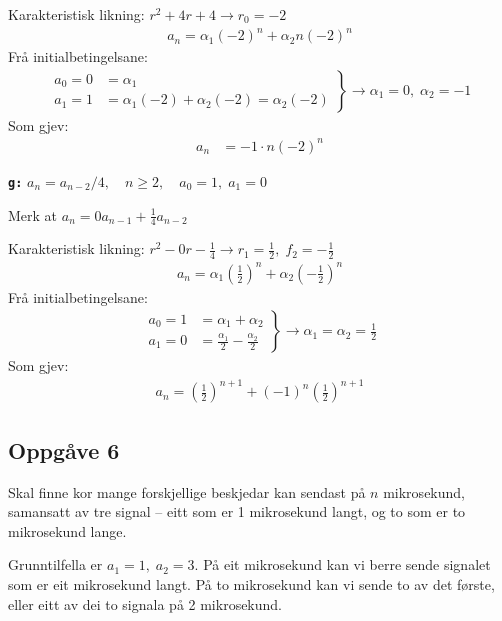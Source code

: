 \documentclass[a4paper, 11pt]{article}
\newcommand{\deloppg}[1]{\vspace{1mm}\noindent \textbf{\tt \themecolor{#1:}}}
\newcommand{\themeshade}{Mahogany}
\newcommand{\themecolor}[1]{\textcolor{\themeshade}{#1}}
\begin{document}
\noindent Karakteristisk likning: \(r^2 + 4r + 4 \rightarrow r_0 = -2\)
\begin{align*}
    a_n = \alpha_1(-2)^n + \alpha_2n(-2)^n
\end{align*}
Frå initialbetingelsane:
\begin{align*}
    \left.\begin{array}{rl}
        a_0 = 0 &= \alpha_1 \\
        a_1 = 1 &= \alpha_1(-2) + \alpha_2(-2) = \alpha_2(-2)
    \end{array} \right\} \rightarrow \alpha_1 = 0,\; \alpha_2 = -1
\end{align*}
Som gjev:
\begin{align*}
    a_n &= -1 \cdot n(-2)^n
\end{align*}


\vspace{8mm}
\deloppg{g} \(a_n = a_{n-2}/4,\quad n \geq 2,\quad a_0 = 1, \; a_1 = 0\)

\noindent Merk at \(a_n = 0a_{n-1} + \frac{1}{4}a_{n-2}\)

\noindent Karakteristisk likning: \(r^2 - 0r - \frac{1}{4} \rightarrow r_1 = \frac{1}{2}, \; f_2 = -\frac{1}{2}\)
\begin{align*}
    a_n = \alpha_1\left(\frac{1}{2}\right)^n + \alpha_2\left(-\frac{1}{2}\right)^n
\end{align*}
Frå initialbetingelsane:
\begin{align*}
    \left.\begin{array}{rl}
        a_0 = 1 &= \alpha_1 + \alpha_2 \\
        a_1 = 0 &= \frac{\alpha_1}{2} - \frac{\alpha_2}{2}
    \end{array}\right\} \rightarrow \alpha_1 = \alpha_2 = \frac{1}{2}
\end{align*}
Som gjev:
\begin{align*}
    a_n = \left(\frac{1}{2}\right)^{n+1} + (-1)^n\left(\frac{1}{2}\right)^{n+1}
\end{align*}

\newpage
\subsection*{Oppgåve 6}
Skal finne kor mange forskjellige beskjedar kan sendast på \(n\) mikrosekund, samansatt av tre signal --
eitt som er 1 mikrosekund langt, og to som er to mikrosekund lange.

Grunntilfella er \(a_1 = 1,\; a_2 = 3\). På eit mikrosekund kan vi berre sende signalet som er eit mikrosekund langt.
På to mikrosekund kan vi sende to av det første, eller eitt av dei to signala på 2 mikrosekund.
\end{document}
